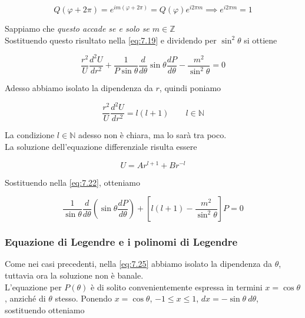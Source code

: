 \begin{equation*}
    Q(\varphi + 2 \pi) = e^{i m (\varphi + 2 \pi)} = Q(\varphi) e ^{i 2 \pi m} \implies e ^{i 2 \pi m} = 1 
\end{equation*}

Sappiamo che \emph{questo accade se e solo se $m \in \mathbb{Z}$} \\


Sostituendo questo risultato nella \ref{eq:7.19} e dividendo per $\sin^2 \theta$ si ottiene

\begin{equation}
    \frac{r^2}{U} \frac{d^2 U}{dr^2} + \frac{1}{P \sin \theta} \frac{d}{d \theta} \sin \theta \frac{dP}{d \theta} - \frac{m^2}{\sin ^2 \theta} = 0
    \label{eq:7.22}
\end{equation}

Adesso abbiamo isolato la dipendenza da $r$, quindi poniamo 

\begin{equation}
    \frac{r^2}{U} \frac{d^2 U}{dr^2} = l(l+1) \qquad l \in \mathbb{N} 
\end{equation}

La condizione $l \in \mathbb{N}$ adesso non è chiara, ma lo sarà tra poco. \\
La soluzione dell'equazione differenziale risulta essere

\begin{equation}
    U = A r^{l +1} + B r^{-l}
\end{equation}

Sostituendo nella \ref{eq:7.22}, otteniamo 

\begin{equation}
    \frac{1}{\sin \theta} \frac{d}{d \theta} \left ( \sin \theta \frac{d P}{d \theta} \right) + \left [ l(l+1) - \frac{m^2}{\sin ^2 \theta} \right ]P = 0
    \label{eq:7.25}
\end{equation}

\subsubsection{Equazione di Legendre e i polinomi di Legendre}

Come nei casi precedenti, nella \ref{eq:7.25} abbiamo isolato la dipendenza da $\theta$, tuttavia ora la soluzione non è banale. \\

L'equazione per $P(\theta)$ è di solito convenientemente espressa in termini $x = \cos \theta$, anziché di $\theta$ stesso. Ponendo $x = \cos \theta$, $-1 \leq x \leq 1$, $dx = - \sin \theta \ d \theta$, sostituendo otteniamo 

